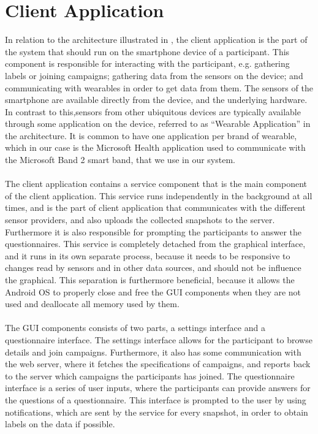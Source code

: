 
\section{Client Application}
\label{sec:client_application}

In relation to the architecture illustrated in , the client application is the part of the system that should run on the smartphone device of a participant. This component is responsible for interacting with the participant, e.g. gathering labels or joining campaigns; gathering data from the sensors on the device; and communicating with wearables in order to get data from them. The sensors of the smartphone are available directly from the device, and the underlying hardware. In contrast to this,sensors from other ubiquitous devices are typically available through some application on the device, referred to as ``Wearable Application'' in the architecture. It is common to have one application per brand of wearable, which in our case is the Microsoft Health application used to communicate with the Microsoft Band 2 smart band, that we use in our system.
\\\\
The client application contains a service component that is the main component of the client application. This service runs independently in the background at all times, and is the part of client application that communicates with the different sensor providers, and also uploads the collected snapshots to the server. Furthermore it is also responsible for prompting the participants to answer the questionnaires. This service is completely detached from the graphical interface, and it runs in its own separate process, because it needs to be responsive to changes read by sensors and in other data sources, and should not be influence the graphical. This separation is furthermore beneficial, because it allows the Android OS to properly close and free the GUI components when they are not used and deallocate all memory used by them. 
\\\\
The GUI components consists of two parts, a settings interface and a questionnaire interface. The settings interface allows for the participant to browse details and join campaigns. Furthermore, it also has some communication with the web server, where it fetches the specifications of campaigns, and reports back to the server which campaigns the participants has joined. The questionnaire interface is a series of user inputs, where the participants can provide answers for the questions of a questionnaire. This interface is prompted to the user by using notifications, which are sent by the service for every snapshot, in order to obtain labels on the data if possible.

